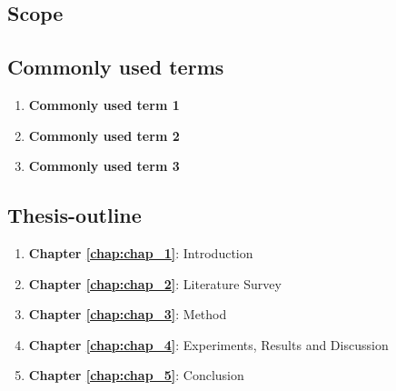 \subsection{Scope}



\subsection{Commonly used terms}

\begin{enumerate}
	\item \textbf{Commonly used term 1}
	
	\item \textbf{Commonly used term 2}
	
	\item \textbf{Commonly used term 3}
\end{enumerate}


\subsection{Thesis-outline}

\begin{enumerate}[label=\Roman*]
	\item {\color{red} \textbf{Chapter \ref{chap:chap_1}}}: Introduction\\
	
	\item {\color{red} \textbf{Chapter \ref{chap:chap_2}}}: Literature Survey\\
	
	\item {\color{red} \textbf{Chapter \ref{chap:chap_3}}}: Method\\
	 
	\item {\color{red} \textbf{Chapter \ref{chap:chap_4}}}: Experiments, Results and Discussion\\
	
	\item {\color{red} \textbf{Chapter \ref{chap:chap_5}}}: Conclusion\\
    
\end{enumerate}
